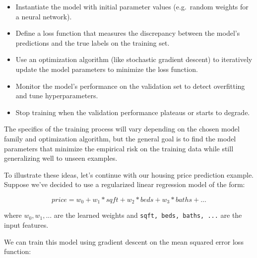 \documentclass[
  9pt,
  letterpaper,
  abstract,
  titlepage]{scrbook}
\begin{document}
\begin{itemize}
\item
  Instantiate the model with initial parameter values (e.g.~random
  weights for a neural network).
\item
  Define a loss function that measures the discrepancy between the
  model's predictions and the true labels on the training set.
\item
  Use an optimization algorithm (like stochastic gradient descent) to
  iteratively update the model parameters to minimize the loss function.
\item
  Monitor the model's performance on the validation set to detect
  overfitting and tune hyperparameters.
\item
  Stop training when the validation performance plateaus or starts to
  degrade.
\end{itemize}

The specifics of the training process will vary depending on the chosen
model family and optimization algorithm, but the general goal is to find
the model parameters that minimize the empirical risk on the training
data while still generalizing well to unseen examples.

To illustrate these ideas, let's continue with our housing price
prediction example. Suppose we've decided to use a regularized linear
regression model of the form:

\[price = w_0 + w_1 * sqft + w_2 * beds + w_3 * baths + ...\]

where \(w_0, w_1, ...\) are the learned weights and
\texttt{sqft,\ beds,\ baths,\ ...} are the input features.

We can train this model using gradient descent on the mean squared error
loss function:
\end{document}
